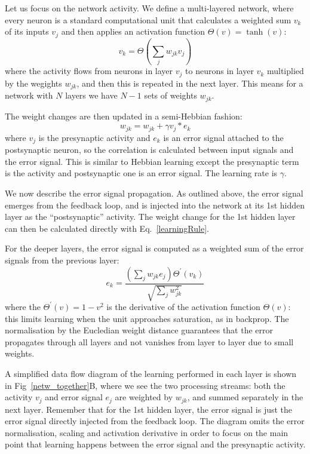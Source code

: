 \documentclass{llncs}
\begin{document}
Let us focus on the network activity. We
define a multi-layered network, where every neuron is a standard
computational unit that calculates a weighted sum $v_k$ of its inputs $v_j$ and
then applies an activation function $\Theta(v) = \tanh(v)$:
\begin{equation}
  v_k = \Theta\left( \sum_j w_{jk} v_{j} \right) \label{act_sum}
\end{equation}
where the activity flows from neurons in layer $v_j$ to neurons in
layer $v_k$ multiplied by the wegights $w_{jk}$, and then this
is repeated in the next layer. This means for a network with
$N$ layers we have $N-1$ sets of weights $w_{jk}$.

The weight changes are then updated in a semi-Hebbian fashion:
\begin{equation}
  w_{jk} = w_{jk} + \gamma v_j * e_k \label{learningRule}
\end{equation}
where $v_j$ is the presynaptic activity and $e_k$ is an error signal
attached to the postsynaptic neuron, so the correlation is
calculated between input signals and the error signal.  This is
similar to Hebbian learning except the presynaptic term is the
activity and postsynaptic one is an error signal. The learning rate is $\gamma$.


We now describe the error signal propagation. As outlined above, the error
signal emerges from the feedback loop, and is injected into the
network at its 1st hidden layer as the ``postsynaptic'' activity. The weight change for the 1st hidden layer can then be calculated directly with Eq.~\ref{learningRule}.

For the deeper layers, the error signal is computed as a weighted
sum of the error signals from the previous layer:
\begin{equation}
  e_k = \frac{\left( \sum_j w_{jk} e_{j} \right) \Theta^\prime (v_k) }{\sqrt{\sum_j w_{jk}^2}}
\end{equation}
where the $\Theta^\prime (v) = 1 - v^2$ is the derivative of the activation
function $\Theta(v)$: this limits learning when the unit approaches saturation,
as in backprop. The normalisation by the Eucledian weight
distance guarantees that the error propagates through all layers and
not vanishes from layer to layer due to small weights.

A simplified data flow diagram of the learning performed in each layer
is shown in Fig~\ref{netw_together}B, where we see the two processing
streams: both the activity $v_j$ and error signal $e_j$ are
weighted by $w_{jk}$, and summed separately in the next layer.
Remember that for the 1st hidden layer, the error signal is just the
error signal directly injected from the feedback loop. The diagram omits the error
normalisation, scaling and activation derivative in order to focus on the main point that learning happens between the error signal and the
presynaptic activity.
\end{document}
